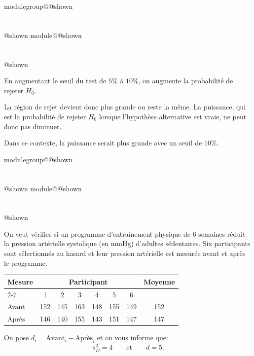 \documentclass{Evaluation}
\makeatletter
\newcommand{\currentmodulekey}{}
\newcommand{\currentmoduletitle}{}
\newcommand{\currentgroupkey}{}
\newcommand{\currentgrouptitle}{}
\newcommand{\showmoduleifneeded}{%
  \ifx\currentgroupkey\empty\else
    \expandafter\ifx\csname modulegroup@\currentgroupkey @shown\endcsname\relax
      \section*{\currentgrouptitle}%
      \expandafter\gdef\csname modulegroup@\currentgroupkey @shown\endcsname{1}%
    \fi
  \fi
  \expandafter\ifx\csname module@\currentmodulekey @shown\endcsname\relax
    \section*{\currentmoduletitle}%
    \expandafter\gdef\csname module@\currentmodulekey @shown\endcsname{1}%
  \fi
}
\newenvironment{H26r}{\showmoduleifneeded}{}
\makeatother
\begin{document}
\begin{questions}
\begin{H26r}
\begin{parts}
\begin{solution}
En augmentant le seuil du test de \(5\%\) à \(10\%\), on augmente la probabilité de rejeter \(H_0\).

La région de rejet devient donc plus grande ou reste la même. La puissance, qui est la probabilité de rejeter \(H_0\) lorsque l'hypothèse alternative est vraie, ne peut donc pas diminuer.

Dans ce contexte, la puissance serait plus grande avec un seuil de \(10\%\).
\end{solution}

\end{parts}
\end{H26r}

\begin{H26r}
\question {} %
On veut vérifier si un programme d'entraînement physique de 6 semaines réduit la pression artérielle systolique (en mmHg) d'adultes sédentaires. Six participants sont sélectionnés au hasard et leur pression artérielle est mesurée avant et après le programme.

\begin{center}
\renewcommand{\arraystretch}{1.5}
\begin{tabular}{|l|cccccc|c|}
\hline
\multirow{2}{*}{Mesure} & \multicolumn{6}{c|}{Participant} & \multirow{2}{*}{Moyenne} \\
\cline{2-7}
 & 1 & 2 & 3 & 4 & 5 & 6 & \\
\hline
Avant & 152 & 145 & 163 & 148 & 155 & 149 & 152 \\
Apr\`es & 146 & 140 & 155 & 143 & 151 & 147 & 147 \\
\hline
\end{tabular}
\end{center}

On pose $d_i = \text{Avant}_i - \text{Après}_i$ et on vous informe que:
\[
s_D^2 = 4 \qquad \text{et} \qquad \bar{d} = 5.
\]

\end{H26r}
\end{questions}
\end{document}
